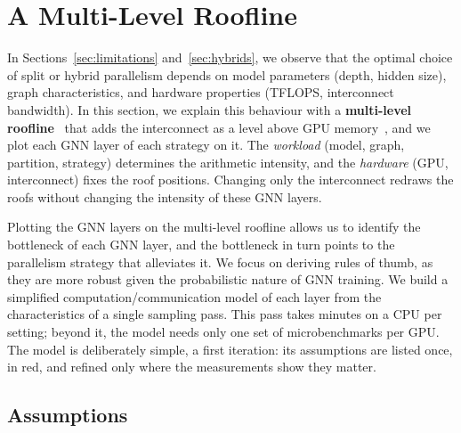 \providecommand{\assume}[1]{{\color{red}#1}}
\providecommand{\flag}[1]{{\color{red}#1}}  %

\section{A Multi-Level Roofline}
\label{sec:roofline}
\label{sec:simulator}  %

In Sections~\ref{sec:limitations} and~\ref{sec:hybrids}, we observe that the optimal choice of
split or hybrid parallelism depends on model parameters (depth, hidden size), graph
characteristics, and hardware properties (TFLOPS, interconnect bandwidth). In this section, we
explain this behaviour with a \textbf{multi-level roofline}~\cite{ilic2014cacheaware,yang2020hierarchical}
that adds the interconnect as a level above GPU memory~\cite{cardwell2019extended,checconi2022ridgeline},
and we plot each GNN layer of each strategy on it. The
\emph{workload} (model, graph, partition, strategy) determines the arithmetic intensity, and the
\emph{hardware} (GPU, interconnect) fixes the roof positions. Changing only the interconnect
redraws the roofs without changing the intensity of these GNN layers.

Plotting the GNN layers on the multi-level roofline allows us to identify the bottleneck of each GNN
layer, and the bottleneck in turn points to the parallelism strategy that alleviates it. We focus
on deriving rules of thumb, as they are more robust given the probabilistic nature of GNN
training. We build a simplified computation/communication model of each layer from the
characteristics of a single sampling pass. This pass takes minutes on a CPU per setting; beyond
it, the model needs only one set of microbenchmarks per GPU. \flag{The model is deliberately simple, a first iteration: its assumptions
are listed once, in red, and refined only where the measurements show they matter.}

\subsection{Assumptions}
\label{sec:cm-purpose}
\label{sec:cm-assumptions}


